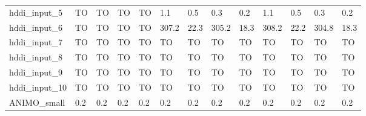 \begin{table}
\begin{adjustbox}{max totalheight=\textheight}
\begin{tabular}{|l|llllllllllll|}
    hddi\_input\_5     & TO       & TO       & TO       & TO       & 1.1   & 0.5  & 0.3   & 0.2  & 1.1               & 0.5               & 0.3               & 0.2               \\
    hddi\_input\_6     & TO       & TO       & TO       & TO       & 307.2 & 22.3 & 305.2 & 18.3 & 308.2             & 22.2              & 304.8             & 18.3              \\
    hddi\_input\_7     & TO       & TO       & TO       & TO       & TO    & TO   & TO    & TO   & TO                & TO                & TO                & TO                \\
    hddi\_input\_8     & TO       & TO       & TO       & TO       & TO    & TO   & TO    & TO   & TO                & TO                & TO                & TO                \\
    hddi\_input\_9     & TO       & TO       & TO       & TO       & TO    & TO   & TO    & TO   & TO                & TO                & TO                & TO                \\
    hddi\_input\_10    & TO       & TO       & TO       & TO       & TO    & TO   & TO    & TO   & TO                & TO                & TO                & TO                \\ \hline
    ANIMO\_small       & 0.2      & 0.2      & 0.2      & 0.2      & 0.2   & 0.2  & 0.2   & 0.2  & 0.2               & 0.2               & 0.2               & 0.2               \\ \hline
    \end{tabular}
\end{adjustbox}
\end{table}

